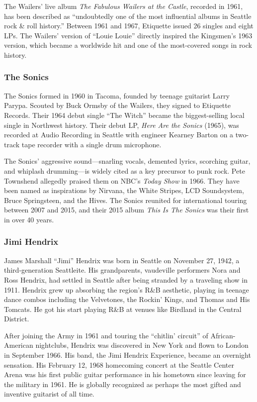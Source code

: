 \documentclass[11pt,letterpaper]{article}
\begin{document}
The Wailers' live album \textit{The Fabulous Wailers at the Castle}, recorded in 1961, has been described as ``undoubtedly one of the most influential albums in Seattle rock \& roll history.'' Between 1961 and 1967, Etiquette issued 26 singles and eight LPs. The Wailers' version of ``Louie Louie'' directly inspired the Kingsmen's 1963 version, which became a worldwide hit and one of the most-covered songs in rock history.

\subsubsection{The Sonics}

The Sonics formed in 1960 in Tacoma, founded by teenage guitarist Larry Parypa. Scouted by Buck Ormsby of the Wailers, they signed to Etiquette Records. Their 1964 debut single ``The Witch'' became the biggest-selling local single in Northwest history. Their debut LP, \textit{Here Are the Sonics} (1965), was recorded at Audio Recording in Seattle with engineer Kearney Barton on a two-track tape recorder with a single drum microphone.

The Sonics' aggressive sound---snarling vocals, demented lyrics, scorching guitar, and whiplash drumming---is widely cited as a key precursor to punk rock. Pete Townshend allegedly praised them on NBC's \textit{Today Show} in 1966. They have been named as inspirations by Nirvana, the White Stripes, LCD Soundsystem, Bruce Springsteen, and the Hives. The Sonics reunited for international touring between 2007 and 2015, and their 2015 album \textit{This Is The Sonics} was their first in over 40 years.

\subsubsection{Jimi Hendrix}

James Marshall ``Jimi'' Hendrix was born in Seattle on November 27, 1942, a third-generation Seattleite. His grandparents, vaudeville performers Nora and Ross Hendrix, had settled in Seattle after being stranded by a traveling show in 1911. Hendrix grew up absorbing the region's R\&B aesthetic, playing in teenage dance combos including the Velvetones, the Rockin' Kings, and Thomas and His Tomcats. He got his start playing R\&B at venues like Birdland in the Central District.

After joining the Army in 1961 and touring the ``chitlin' circuit'' of African-American nightclubs, Hendrix was discovered in New York and flown to London in September 1966. His band, the Jimi Hendrix Experience, became an overnight sensation. His February 12, 1968 homecoming concert at the Seattle Center Arena was his first public guitar performance in his hometown since leaving for the military in 1961. He is globally recognized as perhaps the most gifted and inventive guitarist of all time.
\end{document}
